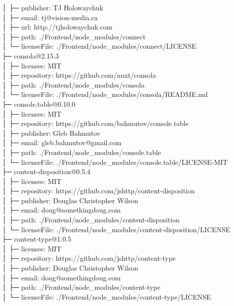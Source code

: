 │  ├─ publisher: TJ Holowaychuk\\
│  ├─ email: tj@vision-media.ca\\
│  ├─ url: http://tjholowaychuk.com\\
│  ├─ path: ./Frontend/node\_modules/connect\\
│  └─ licenseFile: ./Frontend/node\_modules/connect/LICENSE\\
├─ consola@2.15.3\\
│  ├─ licenses: MIT\\
│  ├─ repository: https://github.com/nuxt/consola\\
│  ├─ path: ./Frontend/node\_modules/consola\\
│  └─ licenseFile: ./Frontend/node\_modules/consola/README.md\\
├─ console.table@0.10.0\\
│  ├─ licenses: MIT\\
│  ├─ repository: https://github.com/bahmutov/console.table\\
│  ├─ publisher: Gleb Bahmutov\\
│  ├─ email: gleb.bahmutov@gmail.com\\
│  ├─ path: ./Frontend/node\_modules/console.table\\
│  └─ licenseFile: ./Frontend/node\_modules/console.table/LICENSE-MIT\\
├─ content-disposition@0.5.4\\
│  ├─ licenses: MIT\\
│  ├─ repository: https://github.com/jshttp/content-disposition\\
│  ├─ publisher: Douglas Christopher Wilson\\
│  ├─ email: doug@somethingdoug.com\\
│  ├─ path: ./Frontend/node\_modules/content-disposition\\
│  └─ licenseFile: ./Frontend/node\_modules/content-disposition/LICENSE\\
├─ content-type@1.0.5\\
│  ├─ licenses: MIT\\
│  ├─ repository: https://github.com/jshttp/content-type\\
│  ├─ publisher: Douglas Christopher Wilson\\
│  ├─ email: doug@somethingdoug.com\\
│  ├─ path: ./Frontend/node\_modules/content-type\\
│  └─ licenseFile: ./Frontend/node\_modules/content-type/LICENSE\\
